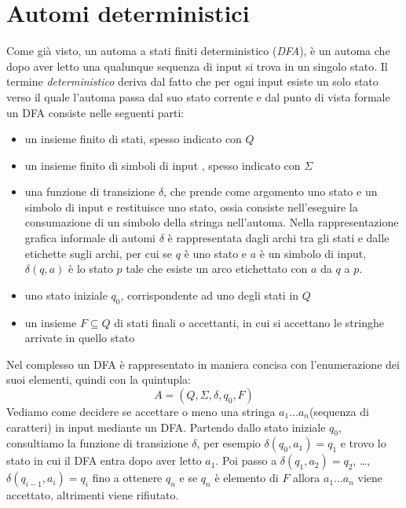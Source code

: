\documentclass[a4paper]{book}
\theoremstyle{definition}%
\begin{document}
\section{Automi deterministici}
Come già visto, un automa a stati finiti deterministico (\textit{DFA}), è un automa che dopo aver letto
una qualunque sequenza di input si trova in un singolo stato.\newline
Il termine \textit{deterministico} deriva dal fatto che per ogni input esiste un solo stato verso il quale l'automa passa dal suo stato corrente
e dal punto di vista formale un DFA consiste nelle seguenti parti:
\begin{itemize}
\item un insieme finito di stati, spesso indicato con $Q$
\item un insieme finito di simboli di input , spesso indicato con $\Sigma$
\item una funzione di transizione $\delta$, che prende come argomento uno stato e un simbolo di input e restituisce uno stato, ossia consiste
      nell'eseguire la consumazione di un simbolo della stringa nell'automa. \newline
      Nella rappresentazione grafica informale di automi $\delta$ è rappresentata dagli archi tra gli stati e dalle etichette sugli archi, per cui
      se $q$ è uno stato e $a$ è un simbolo di input, $\delta(q,a)$ è lo stato $p$ tale che esiste un arco etichettato con $a$ da $q$ a $p$.
\item uno stato iniziale $q_0$, corrispondente ad uno degli stati in $Q$
\item un insieme $F \subseteq Q$ di stati finali o accettanti, in cui si accettano le stringhe
      arrivate in quello stato
\end{itemize}
Nel complesso un DFA è rappresentato in maniera concisa con l'enumerazione dei suoi elementi, quindi con la quintupla:
\[ A=(Q,\Sigma,\delta,q_0,F) \]
Vediamo come decidere se accettare o meno una stringa $a_1 \dots a_n$(sequenza di caratteri) in input mediante un DFA.\newline
Partendo dallo stato iniziale $q_0$, consultiamo la funzione di transizione $\delta$, per esempio
$\delta(q_0,a_1)=q_1$ e trovo lo stato in cui il DFA entra dopo aver letto $a_1$.\newline
Poi passo a $\delta(q_1,a_2)=q_2$, \dots, $\delta(q_{i-1},a_i)=q_i$ fino a ottenere $q_n$
e se $q_n$ è elemento di $F$ allora $a_1...a_n$ viene accettato, altrimenti viene rifiutato.
\end{document}
